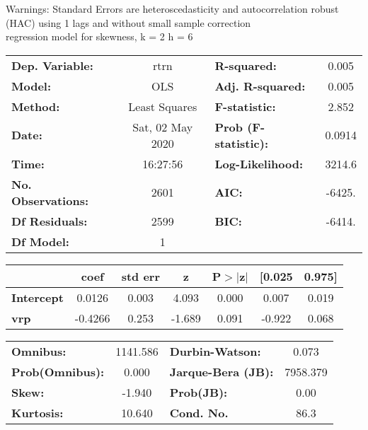 Warnings: \newline
 [1] Standard Errors are heteroscedasticity and autocorrelation robust (HAC) using 1 lags and without small sample correction\\ 

regression model for skewness, k = 2 h = 6\begin{center}
\begin{tabular}{lclc}
\toprule
\textbf{Dep. Variable:}    &       rtrn       & \textbf{  R-squared:         } &     0.005   \\
\textbf{Model:}            &       OLS        & \textbf{  Adj. R-squared:    } &     0.005   \\
\textbf{Method:}           &  Least Squares   & \textbf{  F-statistic:       } &     2.852   \\
\textbf{Date:}             & Sat, 02 May 2020 & \textbf{  Prob (F-statistic):} &   0.0914    \\
\textbf{Time:}             &     16:27:56     & \textbf{  Log-Likelihood:    } &    3214.6   \\
\textbf{No. Observations:} &        2601      & \textbf{  AIC:               } &    -6425.   \\
\textbf{Df Residuals:}     &        2599      & \textbf{  BIC:               } &    -6414.   \\
\textbf{Df Model:}         &           1      & \textbf{                     } &             \\
\bottomrule
\end{tabular}
\begin{tabular}{lcccccc}
                   & \textbf{coef} & \textbf{std err} & \textbf{z} & \textbf{P$> |$z$|$} & \textbf{[0.025} & \textbf{0.975]}  \\
\midrule
\textbf{Intercept} &       0.0126  &        0.003     &     4.093  &         0.000        &        0.007    &        0.019     \\
\textbf{vrp}       &      -0.4266  &        0.253     &    -1.689  &         0.091        &       -0.922    &        0.068     \\
\bottomrule
\end{tabular}
\begin{tabular}{lclc}
\textbf{Omnibus:}       & 1141.586 & \textbf{  Durbin-Watson:     } &    0.073  \\
\textbf{Prob(Omnibus):} &   0.000  & \textbf{  Jarque-Bera (JB):  } & 7958.379  \\
\textbf{Skew:}          &  -1.940  & \textbf{  Prob(JB):          } &     0.00  \\
\textbf{Kurtosis:}      &  10.640  & \textbf{  Cond. No.          } &     86.3  \\
\bottomrule
\end{tabular}
\end{center}

